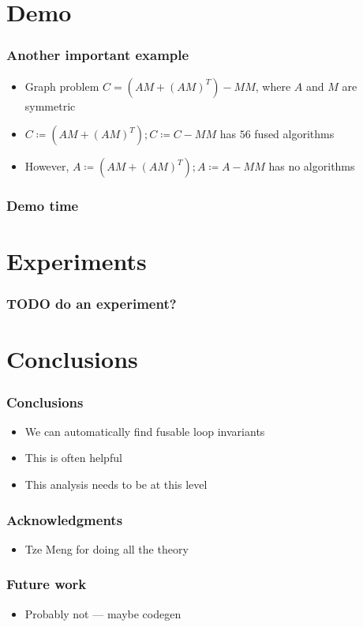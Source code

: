 \documentclass{beamer}
\begin{document}
\section{Demo}

\frame{\sectionpage}

\begin{frame}
  \frametitle{Another important example}
  \begin{itemize}
  \item Graph problem $C = (AM + (AM)^T) - MM$, where $A$ and $M$ are symmetric
  \item $C \coloneqq (AM + (AM)^T); C \coloneqq C - MM$ has $56$ fused algorithms
  \item However, $A \coloneqq (AM + (AM)^T); A \coloneqq A - MM$ has no algorithms
  \end{itemize}
\end{frame}

\begin{frame}
  \frametitle{Demo time}
\end{frame}

\section{Experiments}

\begin{frame}
  \frametitle{TODO do an experiment?}
\end{frame}

\section{Conclusions}

\begin{frame}
  \frametitle{Conclusions}
  \begin{itemize}
  \item We can automatically find fusable loop invariants
  \item This is often helpful
  \item This analysis needs to be at this level
  \end{itemize}
\end{frame}

\begin{frame}
  \frametitle{Acknowledgments}
  \begin{itemize}
  \item Tze Meng for doing all the theory
  \end{itemize}
\end{frame}

\begin{frame}
  \frametitle{Future work}
  \begin{itemize}
  \item Probably not --- maybe codegen
  \end{itemize}
\end{frame}
\end{document}
